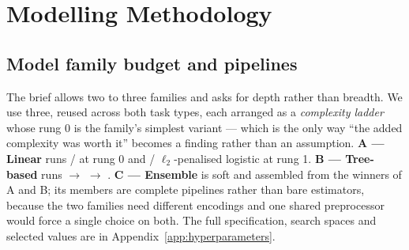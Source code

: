 \section{Modelling Methodology}
\label{sec:method}

\subsection{Model family budget and pipelines}

The brief allows two to three families and asks for depth rather than breadth. We
use three, reused across both task types, each arranged as a \emph{complexity
ladder} whose rung 0 is the family's simplest variant --- which is the only way
``the added complexity was worth it'' becomes a finding rather than an
assumption. \textbf{A --- Linear} runs  /
 at rung 0 and  / $\ell_2$-penalised
logistic at rung 1. \textbf{B --- Tree-based} runs  $\to$
 $\to$ . \textbf{C --- Ensemble} is
soft  and  assembled from the winners of A and B; its
members are complete pipelines rather than bare estimators, because the two
families need different encodings and one shared preprocessor would force a
single choice on both. The full specification, search spaces and selected values
are in Appendix~\ref{app:hyperparameters}.

